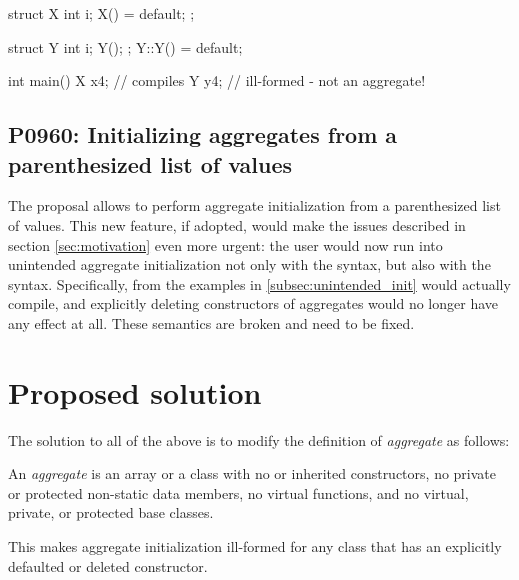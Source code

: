 \begin{codeblock}
struct X {
   int i;
   X() = default;
};

struct Y {
  int i;
  Y();
};
Y::Y() = default;

int main() {
  X x{4};  // compiles
  Y y{4};  // ill-formed - not an aggregate!
}
\end{codeblock}


\subsection{P0960: Initializing aggregates from a parenthesized list of values}

The proposal \cite{P0960} allows to perform aggregate initialization from a parenthesized list of values. This new feature, if adopted, would make the issues described in section \ref{sec:motivation} even more urgent: the user would now run into unintended aggregate initialization not only with the   syntax, but also with the  syntax. Specifically,  from the examples in \ref{subsec:unintended_init} would actually compile, and explicitly deleting constructors of aggregates would no longer have any effect at all. These semantics are broken and need to be fixed.


\section{Proposed solution}

The solution to all of the above is to modify the definition of \emph{aggregate} as follows:

\begin{adjustwidth}{1cm}{1cm}
An \textit{aggregate} is an array or a class with no  or inherited constructors, no private or protected non-static data members, no virtual functions, and no virtual, private, or protected base classes.
\end{adjustwidth}

This makes aggregate initialization ill-formed for any class that has an explicitly defaulted or deleted constructor.


